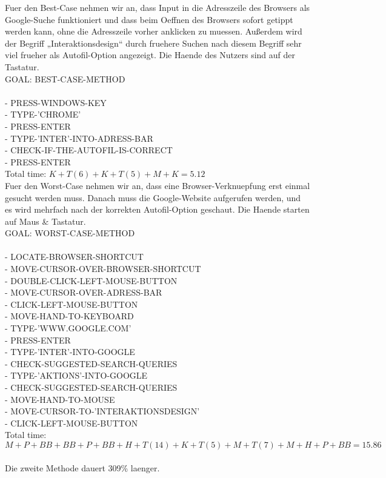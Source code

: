 \documentclass[a4paper,10pt]{article}
\begin{document}
\kopf
\renewcommand{\figurename}{Figure}


Fuer den Best-Case nehmen wir an, dass Input in die Adresszeile des Browsers als Google-Suche funktioniert und dass beim Oeffnen des Browsers sofort getippt werden kann, ohne die Adresszeile vorher anklicken zu muessen. Außerdem wird der Begriff „Interaktionsdesign“ durch fruehere Suchen nach diesem Begriff sehr viel frueher als Autofil-Option angezeigt. Die Haende des Nutzers sind auf der Tastatur. \\

GOAL: BEST-CASE-METHOD \\ \\
-	PRESS-WINDOWS-KEY \\
-	TYPE-'CHROME' \\
-	PRESS-ENTER \\
-	TYPE-'INTER'-INTO-ADRESS-BAR \\
-	CHECK-IF-THE-AUTOFIL-IS-CORRECT \\
-	PRESS-ENTER \\
Total time: $K + T(6) + K + T(5) + M + K = 5.12$ \\

Fuer den Worst-Case nehmen wir an, dass eine Browser-Verknuepfung erst einmal gesucht werden muss. Danach muss die Google-Website aufgerufen werden, und es wird mehrfach nach der korrekten Autofil-Option geschaut. Die Haende starten auf Maus \& Tastatur. \\

GOAL: WORST-CASE-METHOD \\ \\
-	LOCATE-BROWSER-SHORTCUT \\
-	MOVE-CURSOR-OVER-BROWSER-SHORTCUT \\
-	DOUBLE-CLICK-LEFT-MOUSE-BUTTON \\
-	MOVE-CURSOR-OVER-ADRESS-BAR \\
-	CLICK-LEFT-MOUSE-BUTTON \\
-	MOVE-HAND-TO-KEYBOARD \\
-	TYPE-'WWW.GOOGLE.COM' \\
-	PRESS-ENTER \\
-	TYPE-'INTER'-INTO-GOOGLE \\
-	CHECK-SUGGESTED-SEARCH-QUERIES \\
-	TYPE-'AKTIONS'-INTO-GOOGLE \\
-	CHECK-SUGGESTED-SEARCH-QUERIES \\
-	MOVE-HAND-TO-MOUSE \\
-	MOVE-CURSOR-TO-'INTERAKTIONSDESIGN' \\
-	CLICK-LEFT-MOUSE-BUTTON \\
Total time: $M + P + BB + BB + P + BB + H + T(14) + K + T(5) + M + T(7) + M + H + P + BB = 15.86$ \\ \\

Die zweite Methode dauert 309\% laenger.
\end{document}
